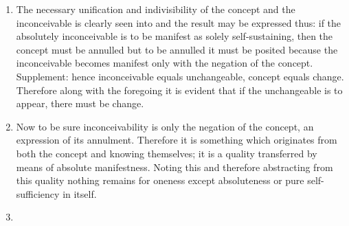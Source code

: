 \documentclass{article}
\begin{document}
\begin{enumerate}
\item 

The necessary unification and indivisibility of the concept and the inconceivable 
is clearly seen into and the result may be expressed thus:
if the absolutely inconceivable is to be manifest as solely self-sustaining,
then the concept must be annulled but to be annulled it must be posited
because the inconceivable becomes manifest only with the negation of the concept.
Supplement: hence inconceivable equals unchangeable, concept equals change.
Therefore along with the foregoing it is evident that
if the unchangeable is to appear, there must be change.

\item

Now to be sure inconceivability is only the negation of the concept,
an expression of its annulment. Therefore it is something
which originates from both the concept and knowing themselves;
it is a quality transferred by means of absolute manifestness.
Noting this and therefore abstracting from this quality
nothing remains for oneness except absoluteness or pure self-sufficiency in itself.

\item


\end{enumerate}
\end{document}
